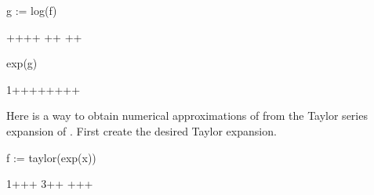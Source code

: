 {{{{{{{{\begin{xtc}
\begin{spadsrc}
g := log(f) 
\end{spadsrc}
\begin{TeXOutput}
\begin{fricasmath}{7}
+\TIMES {}+\TIMES {}+\TIMES {}+\TIMES %
+\TIMES {}+%
\TIMES {}+\TIMES {}+%
%
\end{fricasmath}
\end{TeXOutput}
\end{xtc}
\begin{xtc}
\begin{xtccomment}
\end{xtccomment}
\begin{spadsrc}
exp(g) 
\end{spadsrc}
\begin{TeXOutput}
\begin{fricasmath}{8}
1++++++++%
%
\end{fricasmath}
\end{TeXOutput}
\end{xtc}
\begin{xtc}
\begin{xtccomment}
Here is a way to obtain numerical approximations of
 from the Taylor series expansion of .
First create the desired Taylor expansion.
\end{xtccomment}
\begin{spadsrc}
f := taylor(exp(x)) 
\end{spadsrc}
\begin{TeXOutput}
\begin{fricasmath}{9}
1++\TIMES {}+\TIMES \SUPER%
{}{3}+\TIMES {}+\TIMES %
+\TIMES {}+\TIMES {}+%
\end{fricasmath}

\end{TeXOutput}
\end{xtc}}}}}}}}}
